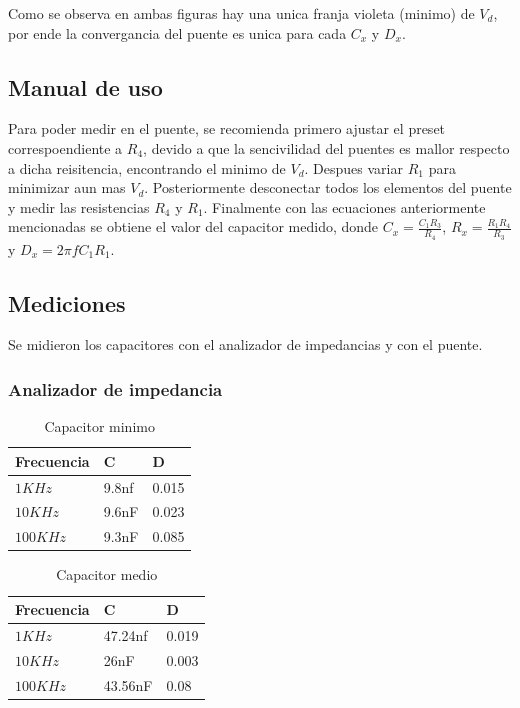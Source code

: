 \documentclass[../../main.tex]{subfiles}
\begin{document}
Como se observa en ambas figuras hay una unica franja violeta (minimo) de $V_d$, por ende la convergancia del puente es unica para cada $C_x$ y $D_x$.

\subsection{Manual de uso}
Para poder medir en el puente, se recomienda primero ajustar el preset correspoendiente a $R_4$, devido a que la sencivilidad del puentes es mallor respecto a dicha reisitencia, encontrando el minimo de $V_d$. Despues variar $R_1$ para minimizar aun mas $V_d$. Posteriormente desconectar todos los elementos del puente y medir las resistencias $R_4$ y $R_1$. Finalmente con las ecuaciones anteriormente mencionadas se obtiene el valor del capacitor medido, donde $C_x=\frac{C_1 R_3}{R_4}$, $R_x=\frac{R_1 R_4}{R_3}$ y $D_x=2 \pi f C_1 R_1$.

\subsection{Mediciones}
Se midieron los capacitores con el analizador de impedancias y con el puente.

\subsubsection{Analizador de impedancia}

\begin{table}[H]
\begin{center}
\begin{tabular}{|l|l|l|}
\hline
 Frecuencia&C&D\\
\hline \hline

$ 1KHz$ &9.8nf&0.015  \\ \hline
$ 10KHz$  & 9.6nF&0.023  \\ \hline
$ 100KHz$  &9.3nF &0.085  \\ \hline

\end{tabular}
\caption{Capacitor minimo } 
\end{center}
\end{table}
\begin{table}[H]
\begin{center}
\begin{tabular}{|l|l|l|}
\hline
 Frecuencia&C&D\\
\hline \hline

$ 1KHz$ &47.24nf&0.019  \\ \hline
$ 10KHz$  & 26nF&0.003 \\ \hline
$ 100KHz$  &43.56nF &0.08  \\ \hline

\end{tabular}
\caption{Capacitor medio } 
\end{center}
\end{table}
\end{document}
